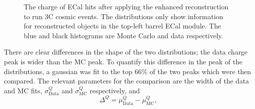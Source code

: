 \begin{figure}%
  \centering
  \caption{The charge of ECal hits after applying the enhanced reconstruction to run 3C cosmic events.  The distributions only show information for reconstructed objects in the top-left barrel ECal module.  The blue and black histograms are Monte Carlo and data respectively.}
  \label{fig:ECalThresholdCovarianceMatrices}
\end{figure}
There are clear differences in the shape of the two distributions; the data charge peak is wider than the MC peak.  To quantify this difference in the peak of the distributions, a gaussian was fit to the top 66$\%$ of the two peaks which were then compared.  The relevant parameters for the comparison are the width of the data and MC fits, $\sigma_{\textrm{Data}}^{Q}$ and $\sigma_{\textrm{MC}}^{Q}$ respectively, and 
\begin{equation}
\Delta^Q = \mu_{\textrm{Data}}^Q - \mu_{\textrm{MC}}^Q,
\end{equation}
